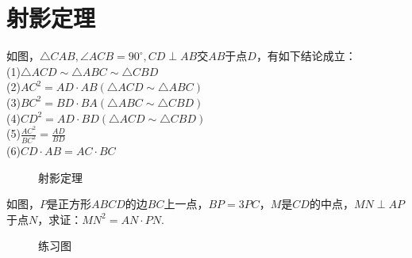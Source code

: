 \section{射影定理}
\begin{definition}
    如图，$\triangle CAB,\angle ACB=90^\circ,CD\perp AB$交$AB$于点$D$，有如下结论成立：\\
    (1)$\triangle ACD \sim \triangle ABC \sim \triangle CBD$ \\
    (2)$AC^2 = AD·AB(\triangle ACD \sim \triangle ABC)$ \\
    (3)$BC^2 = BD·BA(\triangle ABC \sim \triangle CBD)$ \\
    (4)$CD^2 = AD·BD(\triangle ACD \sim \triangle CBD)$ \\
    (5)$\frac{AC^2}{BC^2}=\frac{AD}{BD}$ \\
    (6)$CD·AB = AC·BC$
\end{definition}
\begin{figure}[H]
    \centering
    \resizebox{4cm}{!}{}
    \caption{射影定理}
\end{figure}
\begin{problem}
如图，$P$是正方形$ABCD$的边$BC$上一点，$BP=3PC$，$M$是$CD$的中点，$MN\perp AP$于点$N$，求证：$MN^2=AN·PN.$
\end{problem}
\begin{figure}[H]
    \centering
    \resizebox{4cm}{!}{}
    \caption{练习图}
\end{figure}
\clearpage
